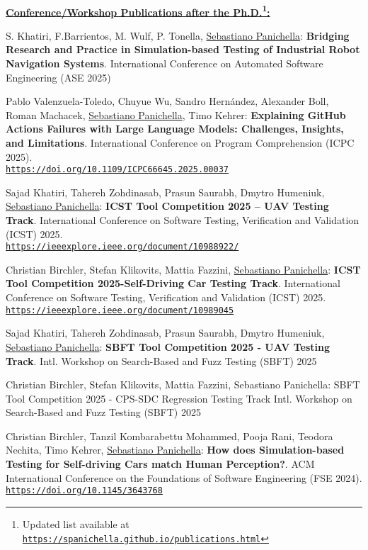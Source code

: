 \documentclass[10pt]{article}
\providecommand*\url[1]{\href{#1}{#1}}
\renewcommand*\url[1]{\href{#1}{\texttt{#1}}}
\begin{document}
\textbf{\\\underline{Conference/Workshop Publications after the Ph.D.\footnote{Updated list available at \url{https://spanichella.github.io/publications.html}}:}}\\
\begin{bibenum}
  \item \label{Cm37} S. Khatiri, F.Barrientos, M. Wulf, P. Tonella, \underline{Sebastiano Panichella}: \textbf{Bridging Research and Practice in Simulation-based Testing of Industrial Robot Navigation Systems}.    International Conference on Automated Software Engineering (ASE 2025)  
\item \label{Cm37} Pablo Valenzuela-Toledo, Chuyue Wu, Sandro Hernández, Alexander Boll, Roman Machacek, \underline{Sebastiano Panichella}, Timo Kehrer: \textbf{Explaining GitHub Actions Failures with Large Language Models: Challenges, Insights, and Limitations}.    International Conference on Program Comprehension (ICPC 2025). \\\url{https://doi.org/10.1109/ICPC66645.2025.00037}
 \item \label{Cm36} Sajad Khatiri, Tahereh Zohdinasab, Prasun Saurabh, Dmytro Humeniuk, \underline{Sebastiano Panichella}: \textbf{ICST Tool Competition 2025 – UAV Testing Track}.     International Conference on Software Testing, Verification and Validation (ICST) 2025.\\\url{https://ieeexplore.ieee.org/document/10988922/}
 \item \label{Cm35} Christian Birchler, Stefan Klikovits, Mattia Fazzini, \underline{Sebastiano Panichella}: \textbf{ICST Tool Competition 2025-Self-Driving Car Testing Track}.   International Conference on Software Testing, Verification and Validation (ICST) 2025. \\\url{https://ieeexplore.ieee.org/document/10989045}  
 \item \label{Cm34} Sajad Khatiri, Tahereh Zohdinasab, Prasun Saurabh, Dmytro Humeniuk, \underline{Sebastiano Panichella}: \textbf{SBFT Tool Competition 2025 - UAV Testing Track}.    Intl. Workshop on Search-Based and Fuzz Testing (SBFT) 2025  
\item \label{Cm33}Christian Birchler, Stefan Klikovits, Mattia Fazzini, Sebastiano Panichella: SBFT Tool Competition 2025 - CPS-SDC Regression Testing Track    Intl. Workshop on Search-Based and Fuzz Testing (SBFT) 2025 
 \item \label{Cm32} Christian Birchler, Tanzil Kombarabettu Mohammed, Pooja Rani, Teodora Nechita, Timo Kehrer, \underline{Sebastiano Panichella}: \textbf{How does Simulation-based Testing for Self-driving Cars match Human Perception?}. ACM International Conference on the Foundations of Software Engineering (FSE 2024). \\\url{https://doi.org/10.1145/3643768}

\end{bibenum}
\end{document}
